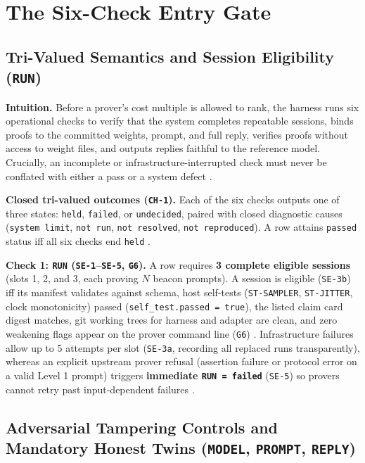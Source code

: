 \documentclass[11pt,letterpaper]{article}
\begin{document}
\section{The Six-Check Entry Gate}

\subsection{Tri-Valued Semantics and Session Eligibility (\texttt{RUN})}

\textbf{Intuition.} Before a prover's cost multiple is allowed to rank, the harness runs six operational checks to verify that the system completes repeatable sessions, binds proofs to the committed weights, prompt, and full reply, verifies proofs without access to weight files, and outputs replies faithful to the reference model. Crucially, an incomplete or infrastructure-interrupted check must never be conflated with either a pass or a system defect \cite{iproofs2026}.

\textbf{Closed tri-valued outcomes (\texttt{CH-1}).} Each of the six checks outputs one of three states: \texttt{held}, \texttt{failed}, or \texttt{undecided}, paired with closed diagnostic causes (\texttt{system limit}, \texttt{not run}, \texttt{not resolved}, \texttt{not reproduced}). A row attains \texttt{passed} status iff all six checks end \texttt{held} \cite{iproofs2026}.

\textbf{Check 1: \texttt{RUN} (\texttt{SE-1}--\texttt{SE-5}, \texttt{G6}).} A row requires \textbf{3 complete eligible sessions} (slots 1, 2, and 3, each proving $N$ beacon prompts). A session is eligible (\texttt{SE-3b}) iff its manifest validates against schema, host self-tests (\texttt{ST-\allowbreak{}SAMPLER}, \texttt{ST-\allowbreak{}JITTER}, clock monotonicity) passed (\texttt{self\_\allowbreak{}test.\allowbreak{}passed = true}), the listed claim card digest matches, git working trees for harness and adapter are clean, and zero weakening flags appear on the prover command line (\texttt{G6}) \cite{iproofs2026}. Infrastructure failures allow up to 5 attempts per slot (\texttt{SE-3a}, recording all replaced runs transparently), whereas an explicit upstream prover refusal (assertion failure or protocol error on a valid Level 1 prompt) triggers \textbf{immediate \texttt{RUN = failed}} (\texttt{SE-5}) so provers cannot retry past input-dependent failures \cite{iproofs2026}.

\subsection{Adversarial Tampering Controls and Mandatory Honest Twins (\texttt{MODEL}, \texttt{PROMPT}, \texttt{REPLY})}
\end{document}
